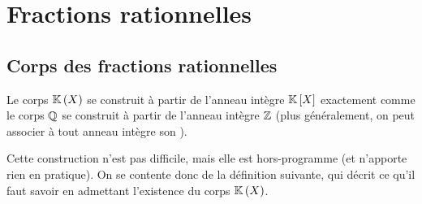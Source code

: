 \section{Fractions rationnelles}

\subsection{Corps des fractions rationnelles}

Le corps \(\fracrat\) se construit à partir de l'anneau intègre \(\poly\) exactement comme le corps \(\mathbb{Q}\) se construit à partir de l'anneau intègre \(\mathbb{Z}\) (plus généralement, on peut associer à tout anneau intègre son ).

Cette construction n'est pas difficile, mais elle est hors-programme (et n'apporte rien en pratique). On se contente donc de la définition suivante, qui décrit ce qu'il faut savoir en admettant l'existence du corps \(\fracrat\).

